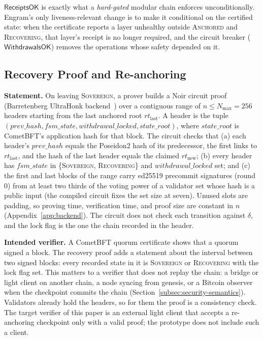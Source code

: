 $\mathsf{ReceiptsOK}$ is exactly what a \emph{hard-gated} modular chain
enforces unconditionally. Engram's only liveness-relevant change is to make
it conditional on the certified state: when the certificate reports a layer
unhealthy outside \textsc{Anchored} and \textsc{Recovering}, that layer's
receipt is no longer required, and the circuit breaker
($\mathsf{WithdrawalsOK}$) removes the operations whose safety depended on
it.

\subsection{Recovery Proof and Re-anchoring}
\label{subsec:reanchoring}

\textbf{Statement.} On leaving \textsc{Sovereign}, a prover builds a
Noir circuit proof (Barretenberg UltraHonk
backend~\cite{aztec_noir_barretenberg,gabizon2019plonk}) over a contiguous
range of $n \leq N_{\max} = 256$ headers starting from the last anchored root
$\mathit{rt}_{\text{last}}$. A header is the tuple $(\mathit{prev\_hash},
\mathit{fsm\_state}, \mathit{withdrawal\_locked}, \mathit{state\_root})$,
where $\mathit{state\_root}$ is CometBFT's application hash for that block.
The circuit checks that (a) each header's $\mathit{prev\_hash}$ equals the
Poseidon2 hash of its predecessor, the first links to $\mathit{rt}_{\text{last}}$,
and the hash of the last header equals the claimed $\mathit{rt}_{\text{new}}$;
(b) every header has $\mathit{fsm\_state}$ in \{\textsc{Sovereign},
\textsc{Recovering}\} and $\mathit{withdrawal\_locked}$ set; and (c) the first
and last blocks of the range carry ed25519 precommit signatures (round 0) from
at least two thirds of the voting power of a validator set whose hash is a
public input (the compiled circuit fixes the set size at seven). Unused
slots are padding, so proving time, verification time, and proof size are
constant in $n$ (Appendix~\ref{app:backend}). The circuit does not check each
transition against $\delta$, and the lock flag is the one the chain recorded
in the header.

\textbf{Intended verifier.} A CometBFT quorum certificate shows that a quorum
signed a block. The recovery proof adds a statement about the interval
between two signed blocks: every recorded state in it is \textsc{Sovereign}
or \textsc{Recovering} with the lock flag set. This matters to a verifier that
does not replay the chain: a bridge or light client on another chain, a node
syncing from genesis, or a Bitcoin observer when the checkpoint commits the
chain (Section~\ref{subsec:security-semantics}). Validators already hold the
headers, so for them the proof is a consistency check. The target verifier of
this paper is an external light client that accepts a re-anchoring checkpoint
only with a valid proof; the prototype does not include such a client.

